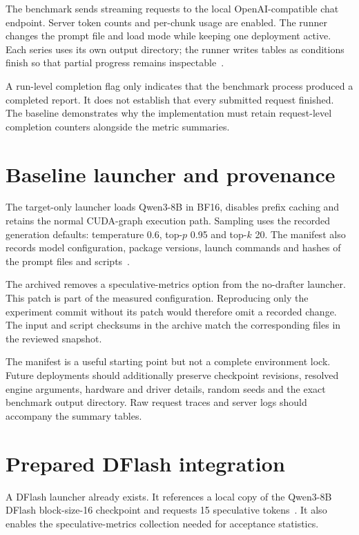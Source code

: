 The benchmark sends streaming requests to the local OpenAI-compatible chat endpoint. Server token counts and per-chunk usage are enabled. The runner changes the prompt file and load mode while keeping one deployment active. Each series uses its own output directory; the runner writes tables as conditions finish so that partial progress remains inspectable~\cite{procedure,repo}.

A run-level completion flag only indicates that the benchmark process produced a completed report. It does not establish that every submitted request finished. The baseline demonstrates why the implementation must retain request-level completion counters alongside the metric summaries.

\section{Baseline launcher and provenance}
The target-only launcher loads Qwen3-8B in BF16, disables prefix caching and retains the normal CUDA-graph execution path. Sampling uses the recorded generation defaults: temperature 0.6, top-$p$ 0.95 and top-$k$ 20. The manifest also records model configuration, package versions, launch commands and hashes of the prompt files and scripts~\cite{baseline}.

The archived  removes a speculative-metrics option from the no-drafter launcher. This patch is part of the measured configuration. Reproducing only the experiment commit without its patch would therefore omit a recorded change. The input and script checksums in the archive match the corresponding files in the reviewed snapshot.

The manifest is a useful starting point but not a complete environment lock. Future deployments should additionally preserve checkpoint revisions, resolved engine arguments, hardware and driver details, random seeds and the exact benchmark output directory. Raw request traces and server logs should accompany the summary tables.

\section{Prepared DFlash integration}
A DFlash launcher already exists. It references a local copy of the Qwen3-8B DFlash block-size-16 checkpoint and requests 15 speculative tokens~\cite{procedure,dflashmodel}. It also enables the speculative-metrics collection needed for acceptance statistics.

